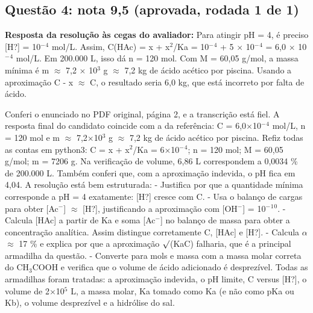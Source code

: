 \documentclass{article}%
\begin{document}
\subsection*{Questão 4: nota 9,5 (aprovada, rodada 1 de 1)}%
\textbf{Resposta da resolução às cegas do avaliador:} Para atingir pH = 4, é preciso {[}H?{]} = 10$^{-}$$^{4}$ mol/L. Assim, C(HAc) = x + x$^2$/Ka = 10$^{-}$$^{4}$ + 5 $\times$ 10$^{-}$$^{4}$ = 6,0 $\times$ 10$^{-}$$^{4}$ mol/L. Em 200.000 L, isso dá n = 120 mol. Com M = 60,05 g/mol, a massa mínima é m $\approx$ 7,2 $\times$ 10$^3$ g $\approx$ 7,2 kg de ácido acético por piscina.\newline%
\newline%
Usando a aproximação C - x $\approx$ C, o resultado seria 6,0 kg, que está incorreto por falta de ácido.\par %
Conferi o enunciado no PDF original, página 2, e a transcrição está fiel. A resposta final do candidato coincide com a da referência: C = 6,0$\times$10$^{-}$$^{4}$ mol/L, n = 120 mol e m $\approx$ 7,2$\times$10$^3$ g $\approx$ 7,2 kg de ácido acético por piscina. Refiz todas as contas em python3: C = x + x$^2$/Ka = 6$\times$10$^{-}$$^{4}$; n = 120 mol; M = 60,05 g/mol; m = 7206 g. Na verificação de volume, 6,86 L correspondem a 0,0034 \% de 200.000 L. Também conferi que, com a aproximação indevida, o pH fica em 4,04.\newline%
\newline%
A resolução está bem estruturada:\newline%
{-} Justifica por que a quantidade mínima corresponde a pH = 4 exatamente: {[}H?{]} cresce com C.\newline%
{-} Usa o balanço de cargas para obter {[}Ac$^{-}${]} $\approx$ {[}H?{]}, justificando a aproximação com {[}OH$^{-}${]} = 10$^{-}$$^{1}$$^{0}$.\newline%
{-} Calcula {[}HAc{]} a partir de Ka e soma {[}Ac$^{-}${]} no balanço de massa para obter a concentração analítica. Assim distingue corretamente C, {[}HAc{]} e {[}H?{]}.\newline%
{-} Calcula $\alpha$ $\approx$ 17 \% e explica por que a aproximação $\surd$(KaC) falharia, que é a principal armadilha da questão.\newline%
{-} Converte para mols e massa com a massa molar correta do CH$_{3}$COOH e verifica que o volume de ácido adicionado é desprezível.\newline%
\newline%
Todas as armadilhas foram tratadas: a aproximação indevida, o pH limite, C versus {[}H?{]}, o volume de 2$\times$10$^{5}$ L, a massa molar, Ka tomado como Ka (e não como pKa ou Kb), o volume desprezível e a hidrólise do sal.\newline%
\end{document}

